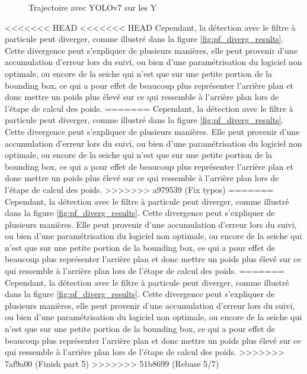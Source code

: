 \begin{figure}[!htbp]
\center
\caption{Trajectoire avec YOLOv7 sur les Y}
\label{fig:trajY_yolo}
\end{figure}
\FloatBarrier
 
<<<<<<< HEAD
<<<<<<< HEAD
Cependant, la détection avec le filtre à particule peut diverger, comme illustré dans la figure \ref{fig:pf_diverg_results}. Cette divergence peut s'expliquer de plusieurs manières, elle peut provenir d'une accumulation d'erreur lors du suivi, ou bien d'une paramétrisation du logiciel non optimale, ou encore de la seiche qui n'est que sur une petite portion de la bounding box, ce qui a pour effet de beaucoup plus représenter l'arrière plan et donc mettre un poids plus élevé sur ce qui ressemble à l'arrière plan lors de l'étape de calcul des poids.
=======
Cependant, la détection avec le filtre à particule peut diverger, comme illustré dans la figure \ref{fig:pf_diverg_results}. Cette divergence peut s'expliquer de plusieurs manières. Elle peut provenir d'une accumulation d'erreur lors du suivi, ou bien d'une paramétrisation du logiciel non optimale, ou encore de la seiche qui n'est que sur une petite portion de la bounding box, ce qui a pour effet de beaucoup plus représenter l'arrière plan et donc mettre un poids plus élevé sur ce qui ressemble à l'arrière plan lors de l'étape de calcul des poids.
>>>>>>> a979539 (Fix typos)
=======
Cependant, la détection avec le filtre à particule peut diverger, comme illustré dans la figure \ref{fig:pf_diverg_results}. Cette divergence peut s'expliquer de plusieurs manières. Elle peut provenir d'une accumulation d'erreur lors du suivi, ou bien d'une paramétrisation du logiciel non optimale, ou encore de la seiche qui n'est que sur une petite portion de la bounding box, ce qui a pour effet de beaucoup plus représenter l'arrière plan et donc mettre un poids plus élevé sur ce qui ressemble à l'arrière plan lors de l'étape de calcul des poids.
=======
Cependant, la détection avec le filtre à particule peut diverger, comme illustré dans la figure \ref{fig:pf_diverg_results}. Cette divergence peut s'expliquer de plusieurs manières, elle peut provenir d'une accumulation d'erreur lors du suivi, ou bien d'une paramétrisation du logiciel non optimale, ou encore de la seiche qui n'est que sur une petite portion de la bounding box, ce qui a pour effet de beaucoup plus représenter l'arrière plan et donc mettre un poids plus élevé sur ce qui ressemble à l'arrière plan lors de l'étape de calcul des poids.
>>>>>>> 7af9a00 (Finish part 5)
>>>>>>> 51b8699 (Rebase 5/7)


